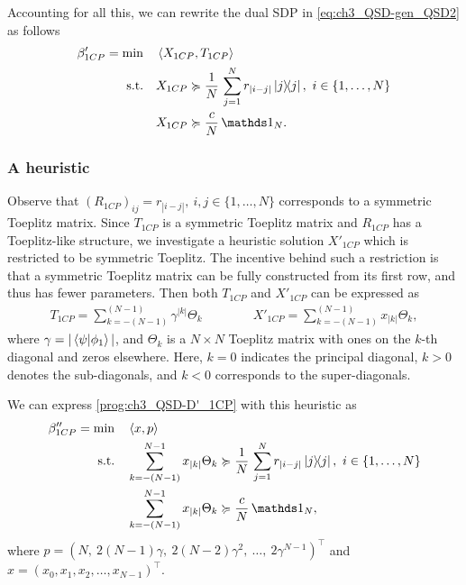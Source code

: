 Accounting for all this, we can rewrite the dual SDP in \eqref{eq:ch3_QSD-gen_QSD2} as follows
\begin{equation}
    \label{prog:ch3_QSD-D'_1CP}
    \begin{aligned}
        \beta'_{1CP} = \min \quad & \inner{X_{1CP}}{T_{1CP}} \\
        \suchthat \quad & X_{1CP} \succcurlyeq \frac{1}{N}\, \sum_{j=1}^N r_{|i - j|} \ketbra{j},\ i \in \{1, \dots, N\} \\
        & X_{1CP} \succcurlyeq \frac{c}{N}\, \id_N.
    \end{aligned}
\end{equation}

\subsubsection{A heuristic}

Observe that $(R_{1CP})_{ij} = r_{|i-j|},\ i, j \in \{1, \dots, N\}$ corresponds to a symmetric Toeplitz matrix.
Since $T_{1CP}$ is a symmetric Toeplitz matrix and $R_{1CP}$ has a Toeplitz-like structure, we investigate a heuristic solution $X'_{1CP}$ which is restricted to be symmetric Toeplitz.
The incentive behind such a restriction is that a symmetric Toeplitz matrix can be fully constructed from its first row, and thus has fewer parameters.
Then both $T_{1CP}$ and $X'_{1CP}$ can be expressed as
\begin{align}
    \label{eq:ch3_QSD-sym_Toep}
    T_{1CP} = \sum_{k=-(N-1)}^{(N-1)} \gamma^{|k|} \Theta_k \quad\qquad\quad X'_{1CP} = \sum_{k=-(N-1)}^{(N-1)} x_{|k|} \Theta_k,
\end{align}
where $\gamma = |\braket{\psi}{\phi_1}|$, and $\Theta_k$ is a $N \times N$ Toeplitz matrix with ones on the $k$-th diagonal and zeros elsewhere.
Here, $k = 0$ indicates the principal diagonal, $k > 0$ denotes the sub-diagonals, and $k < 0$ corresponds to the super-diagonals.

We can express \eqref{prog:ch3_QSD-D'_1CP} with this heuristic as
\begin{equation}
    \label{prog:ch3_QSD-D''_1CP}
    \begin{aligned}
        \beta''_{1CP} = \min \quad & \inner{x}{p} \\
        \suchthat \quad & \sum_{k=-(N-1)}^{N-1} x_{|k|} \Theta_k \succcurlyeq \frac{1}{N}\, \sum_{j=1}^N r_{|i - j|} \ketbra{j},\ i \in \{1, \dots, N\} \\
        & \sum_{k=-(N-1)}^{N-1} x_{|k|} \Theta_k \succcurlyeq \frac{c}{N}\, \id_N,
    \end{aligned}
\end{equation}
where $p = \left( N,\ 2(N-1) \gamma,\ 2(N-2) \gamma^2,\ \ldots,\ 2 \gamma^{N-1} \right)^\top$ and $x = \left( x_0, x_1, x_2, \ldots, x_{N-1} \right)^\top$.

